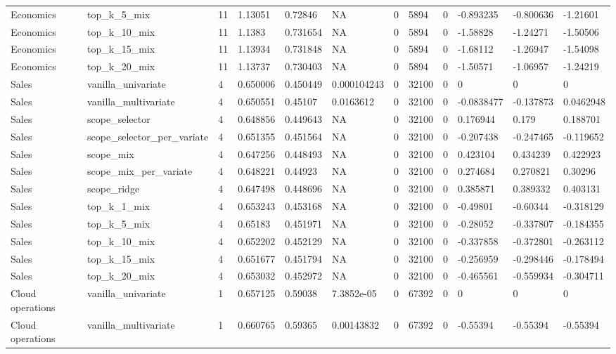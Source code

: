 \begin{tabular}{llllllllllll}
Economics & top\_k\_5\_mix & 11 & 1.13051 & 0.72846 & NA & 0 & 5894 & 0 & -0.893235 & -0.800636 & -1.21601 \\
Economics & top\_k\_10\_mix & 11 & 1.1383 & 0.731654 & NA & 0 & 5894 & 0 & -1.58828 & -1.24271 & -1.50506 \\
Economics & top\_k\_15\_mix & 11 & 1.13934 & 0.731848 & NA & 0 & 5894 & 0 & -1.68112 & -1.26947 & -1.54098 \\
Economics & top\_k\_20\_mix & 11 & 1.13737 & 0.730403 & NA & 0 & 5894 & 0 & -1.50571 & -1.06957 & -1.24219 \\
Sales & vanilla\_univariate & 4 & 0.650006 & 0.450449 & 0.000104243 & 0 & 32100 & 0 & 0 & 0 & 0 \\
Sales & vanilla\_multivariate & 4 & 0.650551 & 0.45107 & 0.0163612 & 0 & 32100 & 0 & -0.0838477 & -0.137873 & 0.0462948 \\
Sales & scope\_selector & 4 & 0.648856 & 0.449643 & NA & 0 & 32100 & 0 & 0.176944 & 0.179 & 0.188701 \\
Sales & scope\_selector\_per\_variate & 4 & 0.651355 & 0.451564 & NA & 0 & 32100 & 0 & -0.207438 & -0.247465 & -0.119652 \\
Sales & scope\_mix & 4 & 0.647256 & 0.448493 & NA & 0 & 32100 & 0 & 0.423104 & 0.434239 & 0.422923 \\
Sales & scope\_mix\_per\_variate & 4 & 0.648221 & 0.44923 & NA & 0 & 32100 & 0 & 0.274684 & 0.270821 & 0.30296 \\
Sales & scope\_ridge & 4 & 0.647498 & 0.448696 & NA & 0 & 32100 & 0 & 0.385871 & 0.389332 & 0.403131 \\
Sales & top\_k\_1\_mix & 4 & 0.653243 & 0.453168 & NA & 0 & 32100 & 0 & -0.49801 & -0.60344 & -0.318129 \\
Sales & top\_k\_5\_mix & 4 & 0.65183 & 0.451971 & NA & 0 & 32100 & 0 & -0.28052 & -0.337807 & -0.184355 \\
Sales & top\_k\_10\_mix & 4 & 0.652202 & 0.452129 & NA & 0 & 32100 & 0 & -0.337858 & -0.372801 & -0.263112 \\
Sales & top\_k\_15\_mix & 4 & 0.651677 & 0.451794 & NA & 0 & 32100 & 0 & -0.256959 & -0.298446 & -0.178494 \\
Sales & top\_k\_20\_mix & 4 & 0.653032 & 0.452972 & NA & 0 & 32100 & 0 & -0.465561 & -0.559934 & -0.304711 \\
Cloud operations & vanilla\_univariate & 1 & 0.657125 & 0.59038 & 7.3852e-05 & 0 & 67392 & 0 & 0 & 0 & 0 \\
Cloud operations & vanilla\_multivariate & 1 & 0.660765 & 0.59365 & 0.00143832 & 0 & 67392 & 0 & -0.55394 & -0.55394 & -0.55394 \\

\end{tabular}
